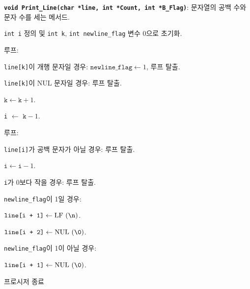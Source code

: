 \documentclass[runningheads]{../../../llncs}
\begin{document}
\textbf{\texttt{void Print_Line(char *line, int *Count, int *B_Flag)}}: 문자열의 공백 수와 문자 수를 세는 메서드.
\begin{algorithm}
	\item \texttt{int i} 정의 및 \texttt{int k}, \texttt{int newline_flag} 변수 0으로 초기화.	
	\item 루프:
			\begin{algorithm}
				\item \texttt{line[k]}이 개행 문자일 경우: $\texttt{newline_flag} \leftarrow 1$, 루프 탈출.
				\item \texttt{line[k]}이 NUL 문자일 경우: 루프 탈출.
				\item $\texttt{k} \leftarrow \texttt{k} + 1$.
			\end{algorithm} 
	\item \texttt{i} $\leftarrow$ $\texttt{k} - 1$.
	\item 루프:
			\begin{algorithm}
				\item \texttt{line[i]}가 공백 문자가 아닐 경우: 루프 탈출.
				\item $\texttt{i} \leftarrow \texttt{i} - 1$.
				\item \texttt{i}가 0보다 작을 경우: 루프 탈출.
			\end{algorithm}
	\item \texttt{newline_flag}이 1일 경우:
			\begin{algorithm}
				\item $\texttt{line[i + 1]} \leftarrow \textrm{LF (\texttt{\textbackslash{}n})}$.
				\item $\texttt{line[i + 2]} \leftarrow \textrm{NUL (\texttt{\textbackslash{}0})}$.
			\end{algorithm}
	\item \texttt{newline_flag}이 1이 아닐 경우:
			\begin{algorithm}
				\item $\texttt{line[i + 1]} \leftarrow \textrm{NUL (\texttt{\textbackslash{}0})}$.
			\end{algorithm}
	\item 프로시저 종료
\end{algorithm}
\end{document}
